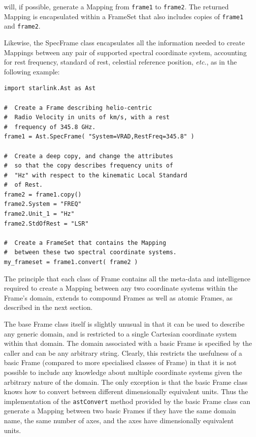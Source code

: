 \documentclass[final,authoryear,5p,times,twocolumn]{elsarticle}
\begin{document}
will, if possible, generate a Mapping from \texttt{frame1} to
\texttt{frame2}. The returned Mapping is encapsulated within a FrameSet that
also includes copies of \texttt{frame1} and \texttt{frame2}.

Likewise, the SpecFrame class encapsulates all the information needed to
create Mappings between any pair of supported spectral coordinate system,
accounting for rest frequency, standard of rest, celestial reference position,
\emph{etc.}, as in the following example:

\begin{lstlisting}
import starlink.Ast as Ast

#  Create a Frame describing helio-centric
#  Radio Velocity in units of km/s, with a rest
#  frequency of 345.8 GHz.
frame1 = Ast.SpecFrame( "System=VRAD,RestFreq=345.8" )

#  Create a deep copy, and change the attributes
#  so that the copy describes frequency units of
#  "Hz" with respect to the kinematic Local Standard
#  of Rest.
frame2 = frame1.copy()
frame2.System = "FREQ"
frame2.Unit_1 = "Hz"
frame2.StdOfRest = "LSR"

#  Create a FrameSet that contains the Mapping
#  between these two spectral coordinate systems.
my_frameset = frame1.convert( frame2 )

\end{lstlisting}

The principle that each class of Frame contains all the meta-data and
intelligence required to create a Mapping between any two coordinate
systems within the Frame's domain, extends to compound Frames as well as
atomic Frames, as described in the next section.

The base Frame class itself is slightly unusual in that it can be used to
describe any generic domain, and is restricted to a single Cartesian
coordinate system within that domain. The domain associated with a basic
Frame is specified by the caller and can be any arbitrary string. Clearly,
this restricts the usefulness of a basic Frame (compared to more
specialised classes of Frame) in that it is not possible to include any
knowledge about multiple coordinate systems given the arbitrary nature of
the domain. The only exception is that the basic Frame class
knows how to convert between different dimensionally equivalent units.
Thus the implementation of the \texttt{astConvert} method provided by the
basic Frame class can generate a Mapping between two basic Frames if they
have the same domain name, the same number of axes, and the axes have
dimensionally equivalent units.
\end{document}
